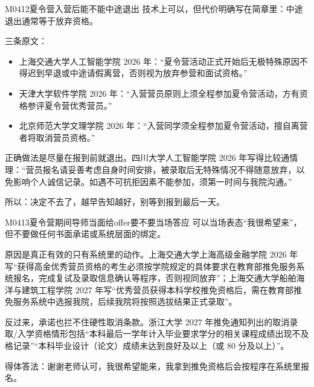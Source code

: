 \begin{qa}{M0412}{夏令营入营后能不能中途退出}
技术上可以，但代价明确写在简章里：中途退出通常等于放弃资格。

三条原文：
\begin{itemize}
  \item 上海交通大学人工智能学院 2026 年：“夏令营活动正式开始后无极特殊原因不得迟到早退或中途请假离营，否则视为放弃参营和面试资格。”
  \item 天津大学软件学院 2026 年：“入营营员原则上须全程参加夏令营活动，方有资格参评夏令营优秀营员。”
  \item 北京师范大学文理学院 2026 年：“入营同学须全程参加夏令营活动，擅自离营者将取消营员资格。”
\end{itemize}

正确做法是尽量在报到前就退出。四川大学人工智能学院 2026 年写得比较通情理：“营员报名请妥善考虑自身时间安排，被录取后无特殊情况不得随意放弃，以免影响个人诚信记录。如遇不可抗拒因素不能参加，须第一时间与我院沟通。”

所以：决定不去了，越早告知越好，别等到报到最后一天。
\end{qa}

\begin{qa}{M0413}{夏令营期间导师当面给offer要不要当场答应}
可以当场表态“我很希望来”，但不要做任何书面承诺或系统层面的绑定。

原因是真正有效的只有系统里的动作。上海交通大学上海高级金融学院 2026 年写“获得高金优秀营员资格的考生必须按学院规定的具体要求在教育部推免服务系统报名，完成复试及录取信息确认等程序，否则视同放弃”；上海交通大学船舶海洋与建筑工程学院 2027 年写“优秀营员获得本科学校推免资格后，需在教育部推免服务系统中选报我院，后续我院将按照选拔结果正式录取”。

反过来，承诺也拦不住硬性取消条款。浙江大学 2027 年推免通知列出的取消录取/入学资格情形包括“本科最后一学年计入毕业要求学分的相关课程成绩出现不及格记录”“本科毕业设计（论文）成绩未达到良好及以上（或 80 分及以上）”。

得体答法：谢谢老师认可，我很希望能来，我拿到推免资格后会按程序在系统里报名。
\end{qa}

